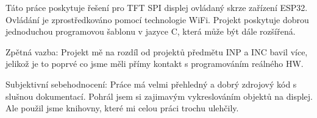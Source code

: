 Táto práce poskytuje řešení pro TFT SPI displej ovládaný skrze zařízení ESP32. Ovládání je zprostředkováno pomocí technologie WiFi. Projekt poskytuje dobrou jednoduchou programovou šablonu v jazyce C, která může být dále rozšířená.

Zpětná vazba: Projekt mě na rozdíl od projektů předmětu INP a INC bavil více, jelikož je to poprvé co jsme měli přímy kontakt s programováním reálného HW.  

Subjektivní sebehodnocení: Práce má velmi přehledný a dobrý zdrojový kód s slušnou dokumentací. Pohrál jsem si zajimavým vykreslováním objektů na displej. Ale použil jsme knihovny, které mi celou práci trochu ulehčily. 



